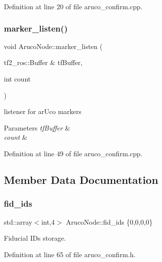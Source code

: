 Definition at line 20 of file aruco\+\_\+confirm.\+cpp.

\mbox{\label{class_aruco_node_ad79fd951057c9a40f34fc159363fbd94}} 
\subsubsection{\texorpdfstring{marker\+\_\+listen()}{marker\_listen()}}
{\footnotesize\ttfamily void Aruco\+Node\+::marker\+\_\+listen (\begin{DoxyParamCaption}\item[{tf2\+\_\+ros\+::\+Buffer \&}]{tf\+Buffer,  }\item[{int}]{count }\end{DoxyParamCaption})}



listener for ar\+Uco markers 


\begin{DoxyParams}{Parameters}
{\em tf\+Buffer} & \\
\hline
{\em count} & \\
\hline
\end{DoxyParams}


Definition at line 49 of file aruco\+\_\+confirm.\+cpp.



\subsection{Member Data Documentation}
\mbox{\label{class_aruco_node_aa64bc8aad47d7569e315f5045ecaa7ac}} 
\subsubsection{\texorpdfstring{fid\+\_\+ids}{fid\_ids}}
{\footnotesize\ttfamily std\+::array$<$int,4$>$ Aruco\+Node\+::fid\+\_\+ids \{0,0,0,0\}}



Fiducial I\+Ds storage. 



Definition at line 65 of file aruco\+\_\+confirm.\+h.

\mbox{\label{class_aruco_node_a454cdb8d15fa07e7913887a1b2029600}} 
